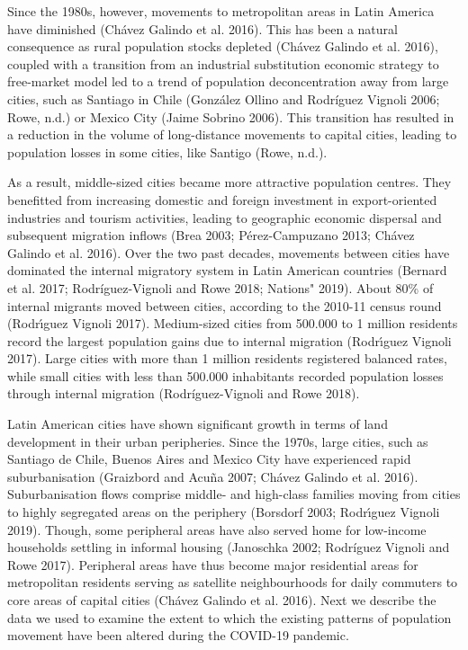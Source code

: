 \documentclass[
  11pt,
]{article}
\begin{document}
Since the 1980s, however, movements to metropolitan areas in Latin
America have diminished (Chávez Galindo et al. 2016). This has been a
natural consequence as rural population stocks depleted (Chávez Galindo
et al. 2016), coupled with a transition from an industrial substitution
economic strategy to free-market model led to a trend of population
deconcentration away from large cities, such as Santiago in Chile
(González Ollino and Rodríguez Vignoli 2006; Rowe, n.d.) or Mexico City
(Jaime Sobrino 2006). This transition has resulted in a reduction in the
volume of long-distance movements to capital cities, leading to
population losses in some cities, like Santigo (Rowe, n.d.).

As a result, middle-sized cities became more attractive population
centres. They benefitted from increasing domestic and foreign investment
in export-oriented industries and tourism activities, leading to
geographic economic dispersal and subsequent migration inflows (Brea
2003; Pérez-Campuzano 2013; Chávez Galindo et al. 2016). Over the two
past decades, movements between cities have dominated the internal
migratory system in Latin American countries (Bernard et al. 2017;
Rodríguez-Vignoli and Rowe 2018; Nations" 2019). About 80\% of internal
migrants moved between cities, according to the 2010-11 census round
(Rodrı́guez Vignoli 2017). Medium-sized cities from 500.000 to 1 million
residents record the largest population gains due to internal migration
(Rodrı́guez Vignoli 2017). Large cities with more than 1 million
residents registered balanced rates, while small cities with less than
500.000 inhabitants recorded population losses through internal
migration (Rodríguez-Vignoli and Rowe 2018).

Latin American cities have shown significant growth in terms of land
development in their urban peripheries. Since the 1970s, large cities,
such as Santiago de Chile, Buenos Aires and Mexico City have experienced
rapid suburbanisation (Graizbord and Acuña 2007; Chávez Galindo et al.
2016). Suburbanisation flows comprise middle- and high-class families
moving from cities to highly segregated areas on the periphery (Borsdorf
2003; Rodrı́guez Vignoli 2019). Though, some peripheral areas have also
served home for low-income households settling in informal housing
(Janoschka 2002; Rodríguez Vignoli and Rowe 2017). Peripheral areas have
thus become major residential areas for metropolitan residents serving
as satellite neighbourhoods for daily commuters to core areas of capital
cities (Chávez Galindo et al. 2016). Next we describe the data we used
to examine the extent to which the existing patterns of population
movement have been altered during the COVID-19 pandemic.
\end{document}
